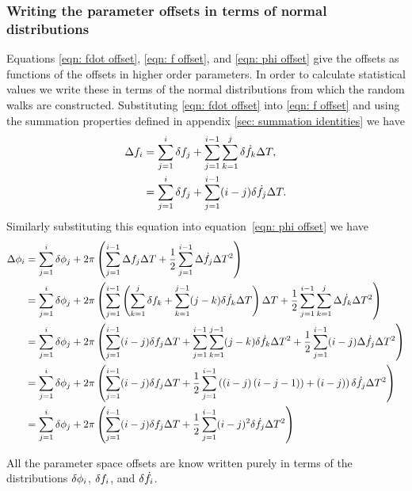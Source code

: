 \subsubsection{Writing the parameter offsets in terms of normal distributions}
Equations \eqref{eqn: fdot offset}, \eqref{eqn: f offset}, and \eqref{eqn: phi
offset} give the offsets as functions of the offsets in higher order
parameters. In order to calculate statistical values we write these in terms of
the normal distributions from which the random walks are constructed. Substituting \eqref{eqn: fdot
offset} into \eqref{eqn: f offset} and using the summation properties defined
in appendix \ref{sec: summation identities} we have
\begin{align}
\Delta f_{i}  & = \sum_{j=1}^{i}\delta f_{j} 
+ \sum_{j=1}^{i-1}\sum_{k=1}^{j}\delta \dot{f}_{k} \Delta T ,  \\
& = \sum_{j=1}^{i}\delta f_{j} 
+ \sum_{j=1}^{i-1}(i-j)\delta \dot{f}_{j} \Delta T . \label{eqn: f hat offset}
\end{align}
Similarly substituting this equation into equation~\eqref{eqn: phi offset} we
have
\begin{align}
\Delta\phi_{i} & = \sum_{j=1}^{i}\delta \phi_{j} 
+ 2\pi \left(\sum_{j=1}^{i-1}\Delta f_{j}\Delta T 
+ \frac{1}{2}\sum_{j=1}^{i-1}\Delta\dot{f}_{j}\Delta T^{2}\right) \notag \\
& = \sum_{j=1}^{i}\delta \phi_{j} + 2\pi\left(\sum_{j=1}^{i-1}\left(\sum_{k=1}^{j}\delta f_{k} 
+ \sum_{k=1}^{j-1}(j-k)\delta\dot{f}_{k}\Delta T\right)\Delta T
 + \frac{1}{2}\sum_{j=1}^{i-1}\sum_{k=1}^{j}\Delta\dot{f}_{k}\Delta T^{2} \right)  \notag \\
& = \sum_{j=1}^{i}\delta \phi_{j} + 2\pi\left(\sum_{j=1}^{i-1}(i-j)\delta f_{j}\Delta T
 + \sum_{j=1}^{i-1}\sum_{k=1}^{j-1}(j-k)\delta\dot{f}_{k}\Delta T^{2}
 + \frac{1}{2}\sum_{j=1}^{i-1}(i-j)\Delta\dot{f}_{j}\Delta T^{2} \right)  \notag \\
& = \sum_{j=1}^{i}\delta \phi_{j} + 2\pi\left(\sum_{j=1}^{i-1}(i-j)\delta f_{j}\Delta T 
 + \frac{1}{2}\sum_{j=1}^{i-1}\left(\left(i-j\right)\left(i-j-1)\right) 
 + (i-j)\right)\delta\dot{f}_{j}\Delta T^{2}\right)  \notag\\
& = \sum_{j=1}^{i}\delta \phi_{j} + 2\pi\left(\sum_{j=1}^{i-1}(i-j)\delta f_{j}\Delta T 
 + \frac{1}{2}\sum_{j=1}^{i-1}(i-j)^{2}\delta\dot{f}_{j}\Delta T^{2}\right)  \notag\\
\end{align}

All the parameter space offsets are know written purely in terms of the 
distributions $\delta \phi_i$, $\delta f_i$, and $\delta \dot{f}_i$. 
%

